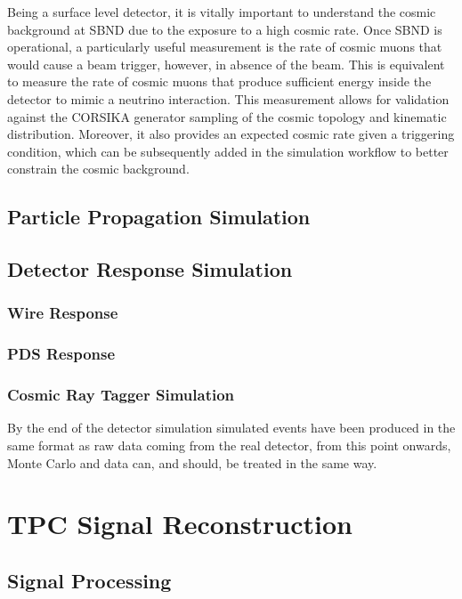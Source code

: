 Being a surface level detector, it is vitally important to understand the cosmic background at SBND due to the exposure to a high cosmic rate.
Once SBND is operational, a particularly useful measurement is the rate of cosmic muons that would cause a beam trigger, however, in absence of the beam.
This is equivalent to measure the rate of cosmic muons that produce sufficient energy inside the detector to mimic a neutrino interaction.
This measurement allows for validation against the CORSIKA generator sampling of the cosmic topology and kinematic distribution. 
Moreover, it also provides an expected cosmic rate given a triggering condition, which can be subsequently added in the simulation workflow to better constrain the cosmic background.

\subsection{Particle Propagation Simulation}
\label{sec:gen_g4}

\subsection{Detector Response Simulation}
\label{sec:gen_response}

\subsubsection{Wire Response}

\subsubsection{PDS Response}

\subsubsection{Cosmic Ray Tagger Simulation}
By the end of the detector simulation simulated events have been produced in the
same format as raw data coming from the real detector, from this point onwards,
Monte Carlo and data can, and should, be treated in the same way.

\section{TPC Signal Reconstruction}

\subsection{Signal Processing}

